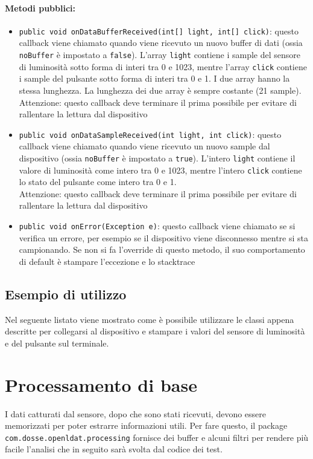 \paragraph{Metodi pubblici:}\begin{itemize}
	\item \texttt{public void onDataBufferReceived(int[] light, int[] click){}}: questo callback viene chiamato quando viene ricevuto un nuovo buffer di dati (ossia \texttt{noBuffer} è impostato a \texttt{false}). L'array \texttt{light} contiene i sample del sensore di luminosità sotto forma di interi tra 0 e 1023, mentre l'array \texttt{click} contiene i sample del pulsante sotto forma di interi tra 0 e 1. I due array hanno la stessa lunghezza. La lunghezza dei due array è sempre costante (21 sample).\\
	Attenzione: questo callback deve terminare il prima possibile per evitare di rallentare la lettura dal dispositivo
	\item \texttt{public void onDataSampleReceived(int light, int click){}}: questo callback viene chiamato quando viene ricevuto un nuovo sample dal dispositivo (ossia \texttt{noBuffer} è impostato a \texttt{true}). L'intero \texttt{light} contiene il valore di luminosità come intero tra 0 e 1023, mentre l'intero \texttt{click} contiene lo stato del pulsante come intero tra 0 e 1.\\
	Attenzione: questo callback deve terminare il prima possibile per evitare di rallentare la lettura dal dispositivo
	\item \texttt{public void onError(Exception e)}: questo callback viene chiamato se si verifica un errore, per esempio se il dispositivo viene disconnesso mentre si sta campionando. Se non si fa l'override di questo metodo, il suo comportamento di default è stampare l'eccezione e lo stacktrace
\end{itemize}

\subsection{Esempio di utilizzo}
Nel seguente listato viene mostrato come è possibile utilizzare le classi appena descritte per collegarsi al dispositivo e stampare i valori del sensore di luminosità e del pulsante sul terminale.


\section{Processamento di base}
I dati catturati dal sensore, dopo che sono stati ricevuti, devono essere memorizzati per poter estrarre informazioni utili. Per fare questo, il package \texttt{com.dosse.openldat.processing} fornisce dei buffer e alcuni filtri per rendere più facile l'analisi che in seguito sarà svolta dal codice dei test.

